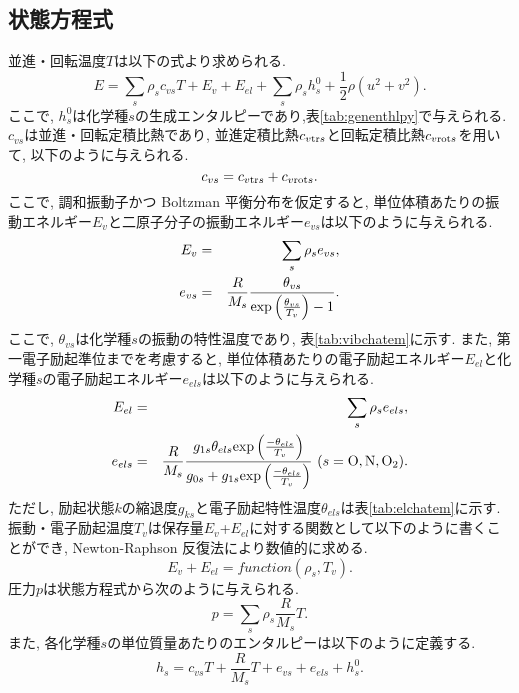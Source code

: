 \subsection*{状態方程式}
並進・回転温度$T$は以下の式より求められる.
\begin{equation}
E=\sum_{s}\rho_{s}c_{vs}T+E_{v}+E_{el}+\sum_{s}\rho_{s}h^{0}_{s}+\frac{1}{2}\rho(u^{2}+v^{2}).
\end{equation}
ここで,
$h^{0}_{s}$は化学種$s$の生成エンタルピーであり,表\ref{tab:genenthlpy}で与えられる.
$c_{vs}$は並進・回転定積比熱であり,
並進定積比熱$c_{v{\rm tr}s}$と回転定積比熱$c_{v{\rm rot}s}$を用いて,
以下のように与えられる.
\begin{equation}
c_{vs}=c_{v{\rm tr}s}+c_{v{\rm rot}s}.
\end{equation}
ここで,
調和振動子かつ Boltzman 平衡分布を仮定すると,
単位体積あたりの振動エネルギー$E_v$と二原子分子の振動エネルギー$e_{vs}$は以下のように与えられる.
\begin{eqnarray}
E_v&=&\sum_{s}\rho_{s}e_{vs},\\
e_{vs}&=&\frac{R}{M_s}\frac{\theta_{vs}}{{\rm exp} \left( \frac{\theta_{vs}}{T_v} \right) -1}.
\end{eqnarray}
ここで,
$\theta_{vs}$は化学種$s$の振動の特性温度であり,
表\ref{tab:vibchatem}に示す.
また,
第一電子励起準位までを考慮すると,
単位体積あたりの電子励起エネルギー$E_{el}$と化学種$s$の電子励起エネルギー$e_{els}$は以下のように与えられる.
\begin{eqnarray}
E_{el}&=&\sum_{s}\rho_{s}e_{els},\\
e_{els}&=&\frac{R}{M_s}\frac{g_{1s}\theta_{els}{\rm exp} \left( \frac{-\theta_{els}}{T_v} \right) }{ g_{0s}+g_{1s}{\rm exp}\left( \frac{-\theta_{els}}{T_v} \right) }~(s={\rm O,N,O_2}).
\end{eqnarray}
ただし,
励起状態$k$の縮退度$g_{ks}$と電子励起特性温度$\theta_{els}$は表\ref{tab:elchatem}に示す.
振動・電子励起温度$T_v$は保存量$E_v$+$E_{el}$に対する関数として以下のように書くことができ,
Newton-Raphson 反復法により数値的に求める.
\begin{equation}
E_{v}+E_{el}=function(\rho_s,T_v).
\end{equation}
圧力$p$は状態方程式から次のように与えられる.
\begin{equation}
p=\sum_{s}\rho_s\frac{R}{M_s}T.
\end{equation}
また,
各化学種$s$の単位質量あたりのエンタルピーは以下のように定義する.
\begin{equation}
h_s=c_{vs}T+\frac{R}{M_s}T+e_{vs}+e_{els}+h^{0}_{s}.
\end{equation}

